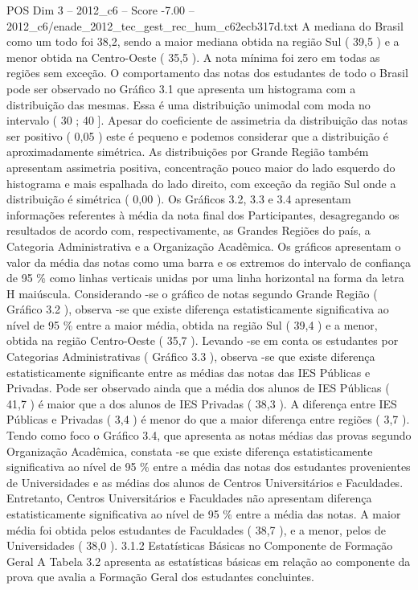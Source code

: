 \begin{textsample}{POS Dim 3 – 2012\_c6 – Score -7.00 – 2012\_c6/enade\_2012\_tec\_gest\_rec\_hum\_c62ecb317d.txt}
A mediana do Brasil como um todo foi 38,2, sendo a maior mediana obtida na região Sul ( 39,5 ) e a menor obtida na Centro-Oeste ( 35,5 ).
A nota mínima foi zero em todas as regiões sem exceção.
O comportamento das notas dos estudantes de todo o Brasil pode ser observado no Gráfico 3.1 que apresenta um histograma com a distribuição das mesmas.
Essa é uma distribuição unimodal com moda no intervalo ( 30 ; 40 ].
Apesar do coeficiente de assimetria da distribuição das notas ser positivo ( 0,05 ) este é pequeno e podemos considerar que a distribuição é aproximadamente simétrica.
As distribuições por Grande Região também apresentam assimetria positiva, concentração pouco maior do lado esquerdo do histograma e mais espalhada do lado direito, com exceção da região Sul onde a distribuição é simétrica ( 0,00 ).
Os Gráficos 3.2, 3.3 e 3.4 apresentam informações referentes à média da nota final dos Participantes, desagregando os resultados de acordo com, respectivamente, as Grandes Regiões do país, a Categoria Administrativa e a Organização Acadêmica.
Os gráficos apresentam o valor da média das notas como uma barra e os extremos do intervalo de confiança de 95 \% como linhas verticais unidas por uma linha horizontal na forma da letra H maiúscula.
Considerando -se o gráfico de notas segundo Grande Região ( Gráfico 3.2 ), observa -se que existe diferença estatisticamente significativa ao nível de 95 \% entre a maior média, obtida na região Sul ( 39,4 ) e a menor, obtida na região Centro-Oeste ( 35,7 ).
Levando -se em conta os estudantes por Categorias Administrativas ( Gráfico 3.3 ), observa -se que existe diferença estatisticamente significante entre as médias das notas das IES Públicas e Privadas.
Pode ser observado ainda que a média dos alunos de IES Públicas ( 41,7 ) é maior que a dos alunos de IES Privadas ( 38,3 ).
A diferença entre IES Públicas e Privadas ( 3,4 ) é menor do que a maior diferença entre regiões ( 3,7 ).
Tendo como foco o Gráfico 3.4, que apresenta as notas médias das provas segundo Organização Acadêmica, constata -se que existe diferença estatisticamente significativa ao nível de 95 \% entre a média das notas dos estudantes provenientes de Universidades e as médias dos alunos de Centros Universitários e Faculdades.
Entretanto, Centros Universitários e Faculdades não apresentam diferença estatisticamente significativa ao nível de 95 \% entre a média das notas.
A maior média foi obtida pelos estudantes de Faculdades ( 38,7 ), e a menor, pelos de Universidades ( 38,0 ). 3.1.2 Estatísticas Básicas no Componente de Formação Geral A Tabela 3.2 apresenta as estatísticas básicas em relação ao componente da prova que avalia a Formação Geral dos estudantes concluintes.

\end{textsample}
